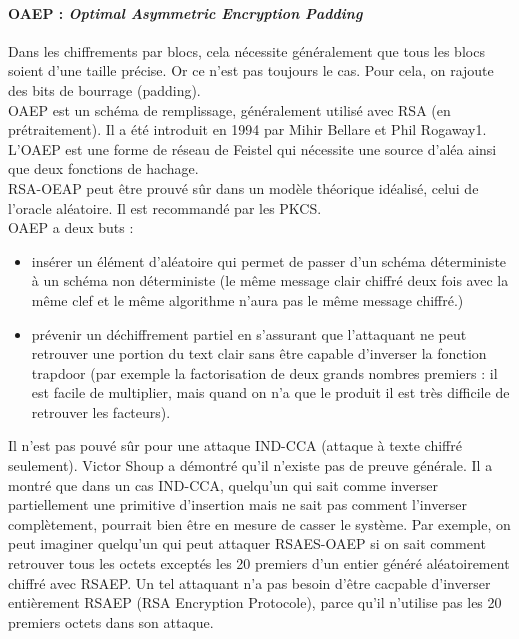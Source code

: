\paragraph{OAEP : \textit{Optimal Asymmetric Encryption Padding}}
Dans les chiffrements par blocs, cela nécessite généralement que tous les blocs soient d'une taille précise. Or ce n'est pas toujours le cas. Pour cela, on rajoute des bits de bourrage (padding).\\
OAEP est un schéma de remplissage, généralement utilisé avec RSA (en prétraitement). Il a été introduit en 1994 par Mihir Bellare et Phil Rogaway1. L'OAEP est une forme de réseau de Feistel qui nécessite une source d'aléa ainsi que deux fonctions de hachage.\\
RSA-OEAP peut être prouvé sûr dans un modèle théorique idéalisé, celui de l'oracle aléatoire. Il est recommandé par les PKCS.\\
OAEP a deux buts :
\begin{itemize}
\item insérer un élément d'aléatoire qui permet de passer d'un schéma déterministe à un schéma non déterministe (le même message clair chiffré deux fois avec la même clef et le même algorithme n'aura pas le même message chiffré.)
\item prévenir un déchiffrement partiel en s'assurant que l'attaquant ne peut retrouver une portion du text clair sans être capable d'inverser la fonction trapdoor (par exemple la factorisation de deux grands nombres premiers : il est facile de multiplier, mais quand on n'a que le produit il est très difficile de retrouver les facteurs).\\
\end{itemize}
Il n'est pas pouvé sûr pour une attaque IND-CCA (attaque à texte chiffré seulement). Victor Shoup a démontré qu'il n'existe pas de preuve générale.
Il a montré que dans un cas IND-CCA, quelqu'un qui sait comme inverser partiellement une primitive d'insertion mais ne sait pas comment l'inverser complètement, pourrait bien être en mesure de casser le système. Par exemple, on peut imaginer quelqu'un qui peut attaquer RSAES-OAEP si on sait comment retrouver tous les octets exceptés les 20 premiers d'un entier généré aléatoirement chiffré avec RSAEP. Un tel attaquant n'a pas besoin d'être cacpable d'inverser entièrement RSAEP (RSA Encryption Protocole), parce qu'il n'utilise pas les 20 premiers octets dans son attaque.


